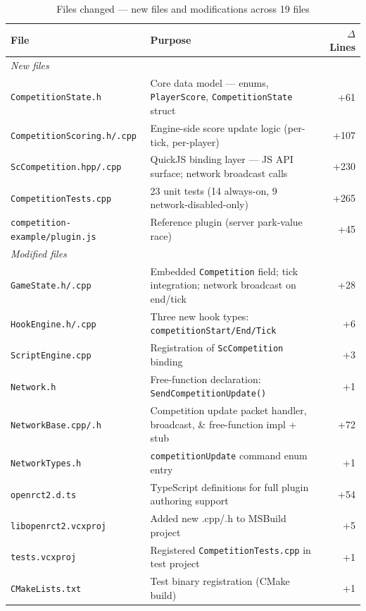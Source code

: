 \documentclass[12pt,a4paper]{article}
\begin{document}
\begin{table}[h!]
\centering
\begin{tabularx}{\linewidth}{lXr}
\toprule
\textbf{File} & \textbf{Purpose} & \textbf{$\Delta$ Lines} \\
\midrule
\multicolumn{3}{l}{\textit{New files}} \\
\texttt{CompetitionState.h} & Core data model --- enums, \texttt{PlayerScore}, \texttt{CompetitionState} struct & +61 \\
\texttt{CompetitionScoring.h/.cpp} & Engine-side score update logic (per-tick, per-player) & +107 \\
\texttt{ScCompetition.hpp/.cpp} & QuickJS binding layer --- JS API surface; network broadcast calls & +230 \\
\texttt{CompetitionTests.cpp} & 23 unit tests (14 always-on, 9 network-disabled-only) & +265 \\
\texttt{competition-example/plugin.js} & Reference plugin (server park-value race) & +45 \\
\midrule
\multicolumn{3}{l}{\textit{Modified files}} \\
\texttt{GameState.h/.cpp} & Embedded \texttt{Competition} field; tick integration; network broadcast on end/tick & +28 \\
\texttt{HookEngine.h/.cpp} & Three new hook types: \texttt{competitionStart/End/Tick} & +6 \\
\texttt{ScriptEngine.cpp} & Registration of \texttt{ScCompetition} binding & +3 \\
\texttt{Network.h} & Free-function declaration: \texttt{SendCompetitionUpdate()} & +1 \\
\texttt{NetworkBase.cpp/.h} & Competition update packet handler, broadcast, \& free-function impl + stub & +72 \\
\texttt{NetworkTypes.h} & \texttt{competitionUpdate} command enum entry & +1 \\
\texttt{openrct2.d.ts} & TypeScript definitions for full plugin authoring support & +54 \\
\texttt{libopenrct2.vcxproj} & Added new .cpp/.h to MSBuild project & +5 \\
\texttt{tests.vcxproj} & Registered \texttt{CompetitionTests.cpp} in test project & +1 \\
\texttt{CMakeLists.txt} & Test binary registration (CMake build) & +1 \\
\bottomrule
\end{tabularx}
\caption{Files changed --- new files and modifications across 19 files}
\end{table}
\end{document}
